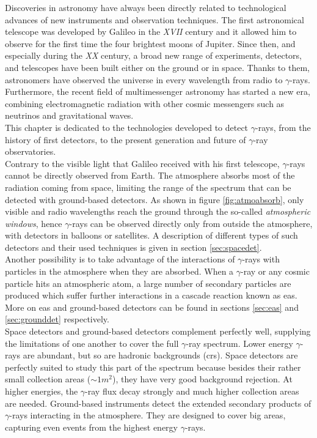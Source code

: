 \documentclass[main.tex]{subfiles}
\begin{document}
\glsresetall
Discoveries in astronomy have always been directly related to technological advances of new instruments and observation techniques. The first astronomical telescope was developed by Galileo in the \textit{XVII} century and it allowed him to observe for the first time the four brightest moons of Jupiter. Since then, and especially during the \textit{XX} century, a broad new range of experiments, detectors, and telescopes have been built either on the ground or in space. Thanks to them, astronomers have observed the universe in every wavelength from radio to $\gamma$-rays. Furthermore, the recent field of multimessenger astronomy has started a new era, combining electromagnetic radiation with other cosmic messengers such as neutrinos and gravitational waves.\\
This chapter is dedicated to the technologies developed to detect $\gamma$-rays, from the history of first detectors, to the present generation and future of $\gamma$-ray observatories.\\
Contrary to the visible light that Galileo received with his first telescope, $\gamma$-rays cannot be directly observed from Earth. The atmosphere absorbs most of the radiation coming from space, limiting the range of the spectrum that can be detected with ground-based detectors. As shown in figure \ref{fig:atmoabsorb}, only visible and radio wavelengths reach the ground through the so-called \textit{atmospheric windows}, hence $\gamma$-rays can be observed directly only from outside the atmosphere, with detectors in balloons or satellites. A description of different types of such detectors and their used techniques is given in section \ref{sec:spacedet}.\\
Another possibility is to take advantage of the interactions of $\gamma$-rays with particles in the atmosphere when they are absorbed. When a $\gamma$-ray or any cosmic particle hits an atmospheric atom, a large number of secondary particles are produced which suffer further interactions in a cascade reaction known as \gls{eas}. More on \gls{eas} and ground-based detectors can be found in sections \ref{sec:eas} and \ref{sec:grounddet} respectively.\\
Space detectors and ground-based detectors complement perfectly well, supplying the limitations of one another to cover the full $\gamma$-ray spectrum. Lower energy $\gamma$-rays are abundant, but so are hadronic backgrounds (\glspl{cr}). Space detectors are perfectly suited to study this part of the spectrum because besides their rather small collection areas ($\sim 1 m^2$), they have very good background rejection. At higher energies, the $\gamma$-ray flux decay strongly and much higher collection areas are needed. Ground-based instruments detect the extended secondary products of $\gamma$-rays interacting in the atmosphere. They are designed to cover big areas, capturing even events from the highest energy $\gamma$-rays.
\end{document}
